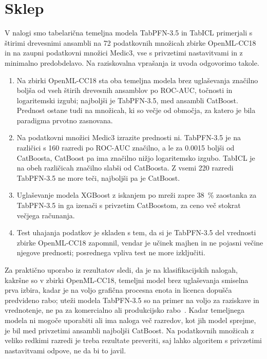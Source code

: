 \documentclass[a4paper,12pt,openright]{book}
\begin{document}
\section{Sklep}
\label{sec:sklep}

V nalogi smo tabelarična temeljna modela TabPFN-3.5 in TabICL primerjali s
štirimi drevesnimi ansambli na 72 podatkovnih množicah zbirke OpenML-CC18 in na
zaupni podatkovni množici Medic3, vse s privzetimi nastavitvami in z minimalno
predobdelavo. Na raziskovalna vprašanja iz uvoda odgovorimo takole.
\begin{enumerate}
\item Na zbirki OpenML-CC18 sta oba temeljna modela brez uglaševanja značilno
boljša od vseh štirih drevesnih ansamblov po ROC-AUC, točnosti in logaritemski
izgubi; najboljši je TabPFN-3.5, med ansambli CatBoost. Prednost ostane tudi na
množicah, ki so večje od območja, za katero je bila paradigma prvotno
zasnovana.
\item Na podatkovni množici Medic3 izrazite prednosti ni. TabPFN-3.5 je na
različici s 160 razredi po ROC-AUC značilno, a le za \num{0.0015} boljši od
CatBoosta, CatBoost pa ima značilno nižjo logaritemsko izgubo. TabICL je na
obeh različicah značilno slabši od CatBoosta. Z vsemi 220 razredi TabPFN-3.5 ne
more teči, najboljši pa je CatBoost.
\item Uglaševanje modela XGBoost z iskanjem po mreži zapre \SI{38}{\percent}
zaostanka za TabPFN-3.5 in ga izenači s privzetim CatBoostom, za ceno več
stokrat večjega računanja.
\item Test uhajanja podatkov je skladen s tem, da si je TabPFN-3.5 del
vrednosti zbirke OpenML-CC18 zapomnil, vendar je učinek majhen in ne pojasni
večine njegove prednosti; posrednega vpliva test ne more izključiti.
\end{enumerate}

Za praktično uporabo iz rezultatov sledi, da je na klasifikacijskih nalogah,
kakršne so v zbirki OpenML-CC18, temeljni model brez uglaševanja smiselna prva
izbira, kadar je na voljo grafična procesna enota in licenca dopušča
predvideno rabo; uteži modela TabPFN-3.5 so na primer na voljo za raziskave in
vrednotenje, ne pa za komercialno ali produkcijsko
rabo~\cite{jager2026tabpfn35}. Kadar temeljnega modela ni mogoče uporabiti ali
ima naloga več razredov, kot jih model sprejme, je bil med privzetimi ansambli
najboljši CatBoost. Na podatkovnih množicah z veliko redkimi razredi je treba
rezultate preveriti, saj lahko algoritem s privzetimi nastavitvami odpove, ne
da bi to javil.
\end{document}
